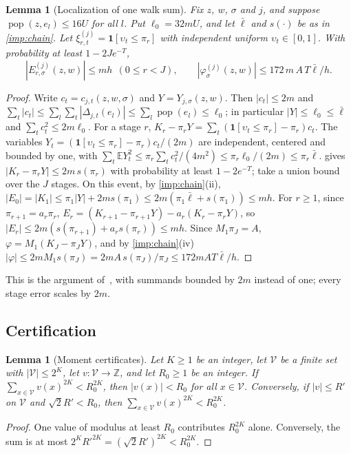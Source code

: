 \documentclass[11pt,letterpaper]{article}
\newtheorem{lemma}[theorem]{Lemma}
\theoremstyle{definition}
\theoremstyle{remark}
\newcommand{\E}{\mathbb E}
\newcommand{\Z}{\mathbb Z}
\newcommand{\pop}{\operatorname{pop}}
\newcommand{\ind}{\mathbf 1}
\begin{document}
\begin{lemma}[Localization of one walk sum]\label{lem:localize}
Fix \(z\), \(w\), \(\sigma\) and \(j\), and suppose
\(\pop(z,e_l)\le16U\) for all \(l\). Put \(\ell_0=32mU\), and let
\(\bar\ell\) and \(s(\cdot)\) be as in \cref{imp:chain}. Let
\(\xi^{(j)}_{r,t}=\ind[\upsilon_t\le\pi_r]\) with independent uniform
\(\upsilon_t\in[0,1]\). With probability at least \(1-2Je^{-T}\),
\[
 |E^{(j)}_{r,\sigma}(z,w)|\le mh\ \ (0\le r<J),\qquad
 |\varphi^{(j)}_\sigma(z,w)|\le172\,m\,A\,T\bar\ell/h .
\]
\end{lemma}
\begin{proof}
Write \(c_t=c_{j,t}(z,w,\sigma)\) and \(Y=Y_{j,\sigma}(z,w)\). Then
\(|c_t|\le2m\) and
\(\sum_t|c_t|\le\sum_l\sum_t|\Delta_{j,t}(e_l)|\le\sum_l\pop(e_l)\le\ell_0\);
in particular \(|Y|\le\ell_0\le\bar\ell\) and
\(\sum_tc_t^2\le2m\ell_0\). For a stage \(r\),
\(K_r-\pi_rY=\sum_t(\ind[\upsilon_t\le\pi_r]-\pi_r)c_t\). The variables
\(Y_t=(\ind[\upsilon_t\le\pi_r]-\pi_r)c_t/(2m)\) are independent,
centered and bounded by one, with
\(\sum_t\E Y_t^2\le\pi_r\sum_tc_t^2/(4m^2)\le\pi_r\ell_0/(2m)\le\pi_r\bar\ell\).
 gives \(|K_r-\pi_rY|\le2m\,s(\pi_r)\) with
probability at least \(1-2e^{-T}\); take a union bound over the \(J\)
stages. On this event, by \cref{imp:chain}(ii),
\(|E_0|=|K_1|\le\pi_1|Y|+2ms(\pi_1)\le2m(\pi_1\bar\ell+s(\pi_1))\le mh\).
For \(r\ge1\), since \(\pi_{r+1}=a_r\pi_r\),
\(E_r=(K_{r+1}-\pi_{r+1}Y)-a_r(K_r-\pi_rY)\), so
\(|E_r|\le2m(s(\pi_{r+1})+a_rs(\pi_r))\le mh\). Since \(M_1\pi_J=A\),
\(\varphi=M_1(K_J-\pi_JY)\), and by \cref{imp:chain}(iv)
\(|\varphi|\le2mM_1s(\pi_J)=2mA\,s(\pi_J)/\pi_J\le172mAT\bar\ell/h\).
\end{proof}

This is the argument of~\cite[Lemma~5.2]{NagCG}, with summands bounded
by \(2m\) instead of one; every stage error scales by \(2m\).

\subsection{Certification}

\begin{lemma}[Moment certificates]\label{lem:moments}
Let \(K\ge1\) be an integer, let \(\mathcal V\) be a finite set with
\(|\mathcal V|\le2^K\), let
\(v:\mathcal V\to\Z\), and let \(R_0\ge1\) be an integer. If
\(\sum_{x\in\mathcal V}v(x)^{2K}<R_0^{2K}\), then \(|v(x)|<R_0\) for all
\(x\in\mathcal V\). Conversely, if \(|v|\le R'\) on \(\mathcal V\) and
\(\sqrt2R'<R_0\), then \(\sum_{x\in\mathcal V}v(x)^{2K}<R_0^{2K}\).
\end{lemma}
\begin{proof}
One value of modulus at least \(R_0\) contributes \(R_0^{2K}\) alone.
Conversely, the sum is at most \(2^KR'^{2K}=(\sqrt2R')^{2K}<R_0^{2K}\).
\end{proof}
\end{document}
